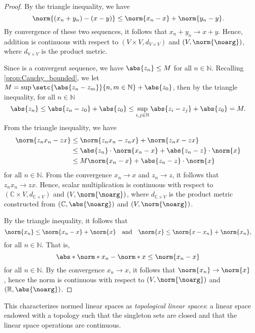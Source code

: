 \begin{proof}
    By the triangle inequality, we have
    \begin{equation*}
        \norm{(x_n + y_n) - (x - y)} \leq \norm{x_n - x} + \norm{y_n - y}.
    \end{equation*}
    By convergence of these two sequences, it follows that \(x_n + y_n \to x + y\). Hence, addition is continuous with respect to \((V \times V, d_{V\times V})\) and \((V, \norm{\noarg})\), where \(d_{\mathbb{V}\times V}\) is the product metric.

    Since  is a convergent sequence, we have \(\abs{z_n} \leq M\) for all \(n \in \mathbb{N}\). Recalling \cref{prop:Cauchy_bounded}, we let \(M = \sup\setc{\abs{z_n - z_m}}{n,m \in \mathbb{N}} + \abs{z_0}\), then by the triangle inequality, for all \(n \in \mathbb{N}\)
    \begin{equation*}
        \abs{z_n} \leq \abs{z_n - z_0} + \abs{z_0} \leq \sup_{i,j \in \mathbb{N}}{\abs{z_i - z_j}} + \abs{z_0} = M.
    \end{equation*}
    From the triangle inequality, we have
    \begin{align*}
        \norm{z_n x_n - zx} &\leq \norm{z_n x_n - z_n x} + \norm{z_n x - zx}\\
                            &\leq \abs{z_n}\cdot \norm{x_n - x} + \abs{z_n - z}\cdot \norm{x}\\
                            &\leq M \norm{x_n - x} + \abs{z_n - z}\cdot\norm{x}
    \end{align*}
    for all \(n \in \mathbb{N}\). From the convergence \(x_n \to x\) and \(z_n \to z\), it follows that \(z_n x_n \to zx\). Hence, scalar multiplication is continuous with respect to \((\mathbb{C} \times V, d_{\mathbb{C}\times V})\) and \((V, \norm{\noarg})\), where \(d_{\mathbb{C}\times V}\) is the product metric constructed from \((\mathbb{C}, \abs{\noarg})\) and \((V, \norm{\noarg})\).

    By the triangle inequality, it follows that
    \begin{equation*}
        \norm{x_n} \leq \norm{x_n - x} + \norm{x}\quad\text{and}\quad \norm{x} \leq \norm{x - x_n} + \norm{x_n},
    \end{equation*}
    for all \(n \in \mathbb{N}\). That is,
    \begin{equation*}
        \abs*{\norm*{x_n} - \norm*{x}} \leq \norm{x_n - x}
    \end{equation*}
    for all \(n \in \mathbb{N}\). By the convergence \(x_n \to x\), it follows that \(\norm{x_n} \to \norm{x}\), hence the norm is continuous with respect to \((V, \norm{\noarg})\) and \((\mathbb{R}, \abs{\noarg})\).
\end{proof}
\begin{remark}
    This characterizes normed linear spaces as \emph{topological linear spaces}: a linear space endowed with a topology such that the singleton sets are closed and that the linear space operations are continuous.
\end{remark}
